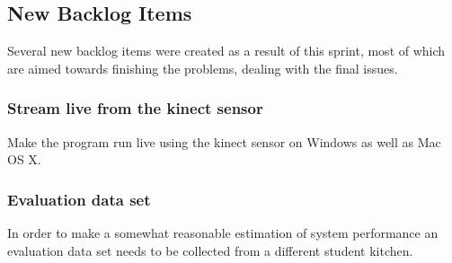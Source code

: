\subsection{New Backlog Items}
Several new backlog items were created as a result of this sprint, most of which are aimed towards finishing the problems, dealing with the final issues.

\subsubsection{Stream live from the kinect sensor}
Make the program run live using the kinect sensor on Windows as well as Mac OS X.

\subsubsection{Evaluation data set}
In order to make a somewhat reasonable estimation of system performance an evaluation data set needs to be collected from a different student kitchen.  



